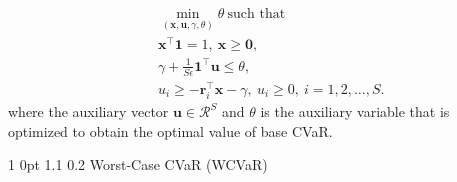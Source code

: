 \documentclass[12pt]{article}
\makeatletter
\numberwithin{equation}{section}
\renewcommand{\subsection}{
  \@startsection
  {subsection}%
  {1}%
  {0pt}%
  {1.1\baselineskip}%
  {0.2\baselineskip}%
  {\sc \centering}%
}
\makeatother
\begin{document}
\begin{eqnarray}
&&\min_{(\mathbf{x},\mathbf{u},\gamma,\theta)}\theta~\text{such that}~\nonumber \\
&&\mathbf{x}^{\top}\mathbf{1}=1,~\mathbf{x} \geq \mathbf{0}, \nonumber \\
&&\gamma+\frac{1}{S\epsilon} \mathbf{1}^{\top}\mathbf{u} \leq \theta, \nonumber \\
&&u_{i} \geq -\mathbf{r}_{i}^{\top}\mathbf{x}-\gamma,~u_{i} \geq 0,~ i=1,2,\dots,S.
\label{eq:6.7}
\end{eqnarray}
where the auxiliary vector $\mathbf{u} \in \mathcal{R}^S$ and $\theta$ is the auxiliary variable that is optimized to obtain the optimal value of base CVaR.

\subsection {Worst-Case CVaR (WCVaR)}
\end{document}

